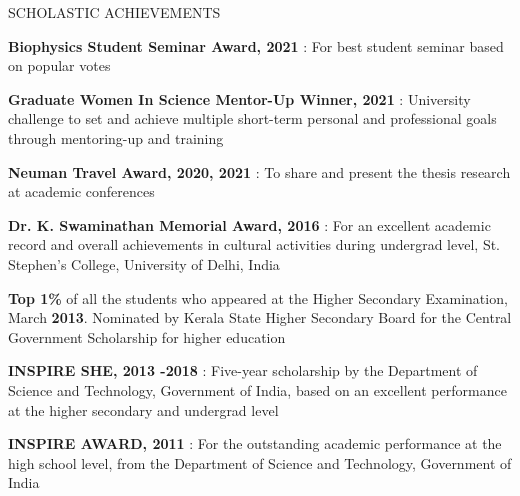 \documentclass{resume} %
\begin{document}
\begin{rSection}{SCHOLASTIC ACHIEVEMENTS} 
\vspace{-1.25em}
\item \textbf{Biophysics Student Seminar Award, 2021} : For best student seminar based on popular votes
\item \textbf{Graduate Women In Science Mentor-Up Winner, 2021} : University challenge to set and achieve multiple short-term personal and professional goals through mentoring-up and training
\item \textbf{Neuman Travel Award, 2020, 2021} : To share and present the thesis research at academic conferences
\item \textbf{Dr. K. Swaminathan Memorial Award, 2016} : For an excellent academic record and overall achievements in cultural activities during undergrad level, St. Stephen's College, University of Delhi, India
\item \textbf{Top 1\%} of all the students who appeared at the Higher Secondary Examination, March \textbf{2013}. Nominated by Kerala State Higher Secondary Board for the Central Government Scholarship for higher education
\item \textbf{INSPIRE SHE, 2013 -2018} : Five-year scholarship by the Department of Science and Technology, Government of India, based on an excellent performance at the higher secondary and undergrad level
\item \textbf{INSPIRE AWARD, 2011} : For the outstanding academic performance at the high school level, from the Department of Science and Technology, Government of India 


\end{rSection}
\end{document}
